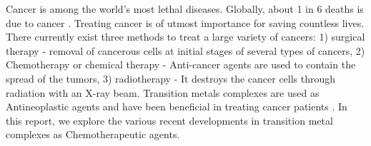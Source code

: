 
Cancer is among the world's most lethal diseases. Globally, about 1 in 6 deaths is due to cancer \cite{cancerFacts}. Treating cancer is of utmost importance for saving countless lives. There currently exist three methods to treat a large variety of cancers: 1) surgical therapy -  removal of cancerous cells at initial stages of several types of cancers, 2) Chemotherapy or chemical therapy - Anti-cancer agents are used to contain the spread of the tumors, 3) radiotherapy - It destroys the cancer cells through radiation with an X-ray beam. Transition metals complexes are used as Antineoplastic agents and have been beneficial in treating cancer patients \cite{rafique2010transition}. In this report, we explore the various recent developments in transition metal complexes as Chemotherapeutic agents.
